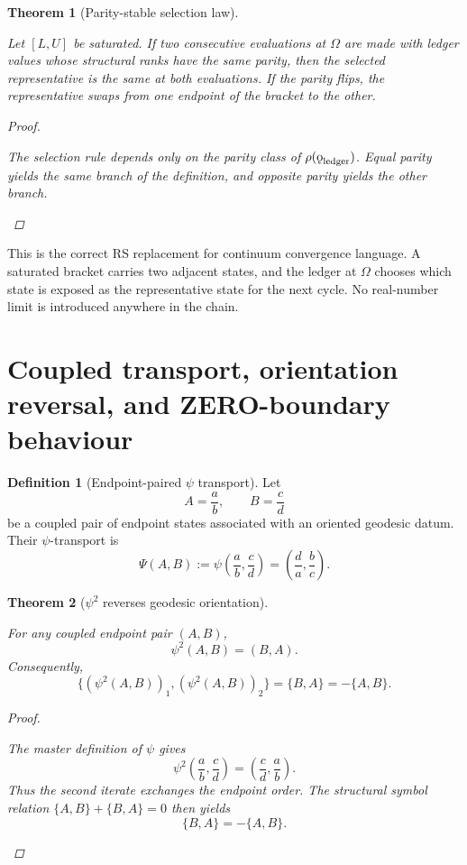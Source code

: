 \documentclass[11pt, letterpaper]{article}
\newcommand{\rank}{\rho}
\newcommand{\koppa}{\mathbin{\text{\rm\k{o}}}}
\newcommand{\Psistate}{\Psi}
\theoremstyle{definition}
\newtheorem{definition}{Definition}[section]
\theoremstyle{plain}
\newtheorem{theorem}{Theorem}[section]
\begin{document}
\begin{theorem}[Parity-stable selection law]
\begin{rsbox}
Let $[L,U]$ be saturated.  If two consecutive evaluations at $\Omega$ are made
with ledger values whose structural ranks have the same parity, then the
selected representative is the same at both evaluations.  If the parity flips,
the representative swaps from one endpoint of the bracket to the other.
\end{rsbox}
\begin{proof}
\begin{rsbox}
The selection rule depends only on the parity class of
$\rank(\koppa_{\mathrm{ledger}})$.  Equal parity yields the same branch of the
definition, and opposite parity yields the other branch.
\end{rsbox}
\end{proof}

\end{theorem}

\begin{observebox}
This is the correct RS replacement for continuum convergence language.  A
saturated bracket carries two adjacent states, and the ledger at $\Omega$
chooses which state is exposed as the representative state for the next cycle.
No real-number limit is introduced anywhere in the chain.
\end{observebox}

\section{Coupled transport, orientation reversal, and ZERO-boundary behaviour}

\begin{definition}[Endpoint-paired $\psi$ transport]
Let
\[
A=\frac{a}{b},
\qquad
B=\frac{c}{d}
\]
be a coupled pair of endpoint states associated with an oriented geodesic datum.
Their $\psi$-transport is
\[
\Psistate(A,B):=
\psi\!\left(\frac{a}{b},\frac{c}{d}\right)
=
\left(\frac{d}{a},\frac{b}{c}\right).
\]
\end{definition}

\begin{theorem}[$\psi^2$ reverses geodesic orientation]
\begin{rsbox}
For any coupled endpoint pair $(A,B)$,
\[
\psi^2(A,B)=(B,A).
\]
Consequently,
\[
\{(\psi^2(A,B))_1,(\psi^2(A,B))_2\}=\{B,A\}=-\{A,B\}.
\]
\end{rsbox}
\begin{proof}
\begin{rsbox}
The master definition of $\psi$ gives
\[
\psi^2\!\left(\frac{a}{b},\frac{c}{d}\right)
=
\left(\frac{c}{d},\frac{a}{b}\right).
\]
Thus the second iterate exchanges the endpoint order.  The structural symbol
relation $\{A,B\}+\{B,A\}=0$ then yields
\[
\{B,A\}=-\{A,B\}.
\]
\end{rsbox}
\end{proof}

\end{theorem}
\end{document}
